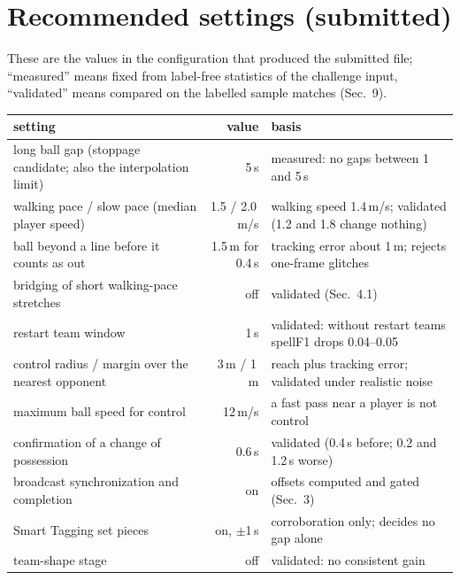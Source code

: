 \documentclass[10pt,a4paper]{article}
\begin{document}
\section{Recommended settings (submitted)}
These are the values in the configuration that produced the submitted file; ``measured'' means fixed from label-free statistics
of the challenge input, ``validated'' means compared on the labelled sample matches (Sec.~9).
\begin{center}\small\vspace{-4pt}
\begin{tabularx}{\linewidth}{@{}lrY@{}}
\toprule
setting & value & basis \\
\midrule
long ball gap (stoppage candidate; also the interpolation limit) & 5\,s & measured: no gaps between 1 and 5\,s \\
walking pace / slow pace (median player speed) & 1.5 / 2.0\,m/s & walking speed 1.4\,m/s; validated (1.2 and 1.8 change nothing) \\
ball beyond a line before it counts as out & 1.5\,m for 0.4\,s & tracking error about 1\,m; rejects one-frame glitches \\
bridging of short walking-pace stretches & off & validated (Sec.~4.1) \\
restart team window & 1\,s & validated: without restart teams spellF1 drops 0.04--0.05 \\
control radius / margin over the nearest opponent & 3\,m / 1\,m & reach plus tracking error; validated under realistic noise \\
maximum ball speed for control & 12\,m/s & a fast pass near a player is not control \\
confirmation of a change of possession & 0.6\,s & validated (0.4\,s before; 0.2 and 1.2\,s worse) \\
broadcast synchronization and completion & on & offsets computed and gated (Sec.~3) \\
Smart Tagging set pieces & on, $\pm$1\,s & corroboration only; decides no gap alone \\
team-shape stage & off & validated: no consistent gain \\
\bottomrule
\end{tabularx}\vspace{-4pt}
\end{center}
\end{document}
